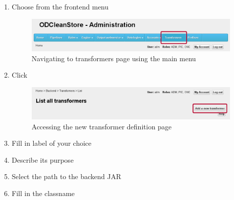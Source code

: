 {\begin{enumerate}
	\item Choose  from the frontend menu

\begin{figure}[!ht]
    \centering
    \includegraphics[width=\textwidth]{images/fe-walkthrough-menu-transformers.png}
    \caption{Navigating to transformers page using the main menu}
	\label{fig:feWTMenuTransformers}
\end{figure}
\FloatBarrier

\vspace*{0.2\textheight}

	\item Click 

\begin{figure}[!ht]
    \centering
    \includegraphics[width=\textwidth]{images/fe-walkthrough-add-transformer.png}
    \caption{Accessing the new transformer definition page}
	\label{fig:feWTAddTransformer}
\end{figure}
\FloatBarrier

\newpage

\vspace*{0.2\textheight}

	\item Fill in label of your choice
	
	\item Describe its purpose
	
	\item Select the path to the backend JAR
	
	\item Fill in the classname
	

\end{enumerate}}
